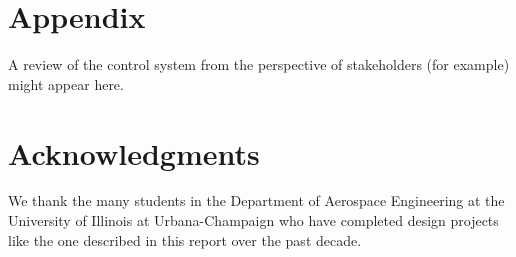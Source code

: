\documentclass[conf]{new-aiaa}
\begin{document}
\section*{Appendix}

A review of the control system from the perspective of stakeholders (for example) might appear here.

\section*{Acknowledgments}

We thank the many students in the Department of Aerospace Engineering at the University of Illinois at Urbana-Champaign who have completed design projects like the one described in this report over the past decade.


\end{document}
